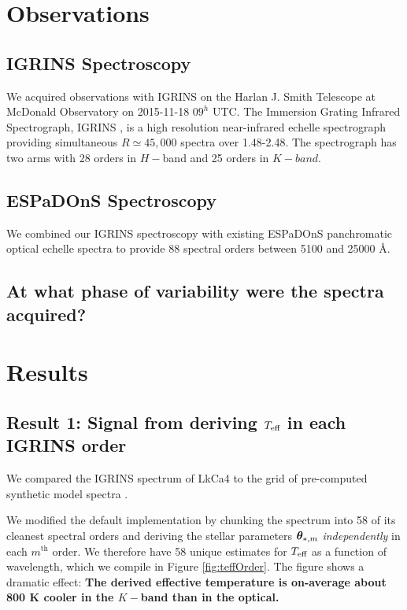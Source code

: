\documentclass[onecolumn]{emulateapj}%
\newcommand{\name}{LkCa4 }
\begin{document}
\section{Observations}\label{sec:obs} 

\subsection{IGRINS Spectroscopy}\label{sec:igrins} 
We acquired observations with IGRINS on the Harlan J. Smith Telescope at McDonald Observatory on 2015-11-18 $09^h$ UTC.  The Immersion Grating Infrared Spectrograph, IGRINS \citep{2014SPIE.9147E..1DP,2012SPIE.8450E..2SG}, is a high resolution near-infrared echelle spectrograph providing simultaneous $R\simeq45,000$ spectra over 1.48-2.48\um.  The spectrograph has two arms with 28 orders in $H-$band and 25 orders in $K-band$.

\subsection{ESPaDOnS Spectroscopy}
We combined our IGRINS spectroscopy with existing ESPaDOnS panchromatic optical echelle spectra to provide 88 spectral orders between 5100 and 25000 \AA \citep{2014MNRAS.444.3220D}.

\subsection{At what phase of variability were the spectra acquired?}


\section{Results}

\subsection{Result 1: Signal from deriving $T_\textrm{eff}$ in each IGRINS order}

We compared the IGRINS spectrum of \name to the \PHOENIX grid of pre-computed synthetic model spectra \citep{2013A&A...553A...6H}.  

We modified the default implementation by chunking the spectrum into 58 of its cleanest spectral orders and deriving the stellar parameters ${\bm \theta}_{\ast,m}$ \emph{independently} in each $m^{\mathrm{th}}$ order.  We therefore have 58 unique estimates for $T_\textrm{eff}$ as a function of wavelength, which we compile in Figure \ref{fig:teffOrder}.  The figure shows a dramatic effect: \textbf{The derived effective temperature is on-average about 800 K cooler in the $K-$band than in the optical.}  
\end{document}

